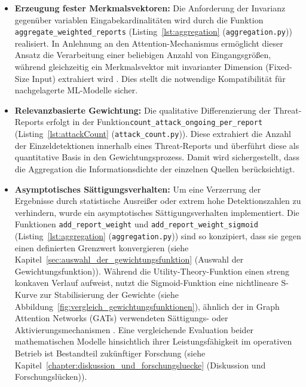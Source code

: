\begin{itemize}
    \item \textbf{Erzeugung fester Merkmalsvektoren:}
    Die Anforderung der Invarianz gegenüber variablen Eingabekardinalitäten wird durch die Funktion \texttt{aggregate\_weighted\_reports} (Listing~\ref{lst:aggregation} (\texttt{aggregation.py})) realisiert. In Anlehnung an den Attention-Mechanismus ermöglicht dieser Ansatz die Verarbeitung einer beliebigen Anzahl von Eingangsgrößen, während gleichzeitig ein Merkmalsvektor mit invarianter Dimension (Fixed-Size Input) extrahiert wird \cite{velickovic2018gat}. Dies stellt die notwendige Kompatibilität für nachgelagerte ML-Modelle sicher.

    \item \textbf{Relevanzbasierte Gewichtung:}
    Die qualitative Differenzierung der Threat-Reports erfolgt in der Funktion\texttt{count\_attack\_ongoing\_per\_report} (Listing~\ref{lst:attackCount} (\texttt{attack\_count.py})). Diese extrahiert die Anzahl der Einzeldetektionen innerhalb eines Threat-Reports und überführt diese als quantitative Basis in den Gewichtungsprozess. Damit wird sichergestellt, dass die Aggregation die Informationsdichte der einzelnen Quellen berücksichtigt.

    \item \textbf{Asymptotisches Sättigungsverhalten:}
    Um eine Verzerrung der Ergebnisse durch statistische Ausreißer oder extrem hohe Detektionszahlen zu verhindern, wurde ein asymptotisches Sättigungsverhalten implementiert. Die Funktionen \texttt{add\_report\_weight} und \texttt{add\_report\_weight\_sigmoid} (Listing~\ref{lst:aggregation} (\texttt{aggregation.py})) sind so konzipiert, dass sie gegen einen definierten Grenzwert konvergieren (siehe Kapitel~\ref{sec:auswahl_der_gewichtungsfunktion} (Auswahl der Gewichtungsfunktion)). Während die Utility-Theory-Funktion einen streng konkaven Verlauf aufweist, nutzt die Sigmoid-Funktion eine nichtlineare S-Kurve zur Stabilisierung der Gewichte (siehe Abbildung~\ref{fig:vergleich_gewichtungsfunktionen}), ähnlich der in Graph Attention Networks (GATs) verwendeten Sättigungs- oder Aktivierungsmechanismen \cite{velickovic2018gat, perezmaldonado2025sigmoid}. Eine vergleichende Evaluation beider mathematischen Modelle hinsichtlich ihrer Leistungsfähigkeit im operativen Betrieb ist Bestandteil zukünftiger Forschung (siehe Kapitel~\ref{chapter:diskussion_und_forschungsluecke} (Diskussion und Forschungslücken)).
\end{itemize}